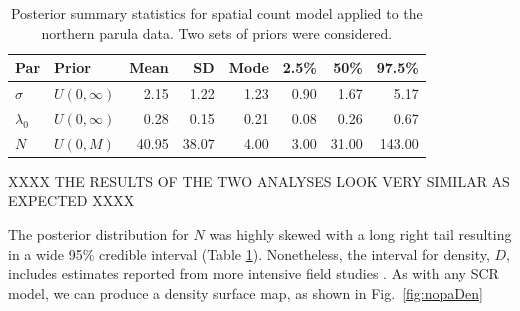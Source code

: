 \begin{table}%
  \caption{Posterior summary statistics for spatial count
    model applied to the northern parula data. Two sets of priors were
    considered. }
  \begin{tabular}{l l rrrrrr}
    \hline
    Par          & Prior          & Mean  & SD    & Mode  & 2.5\% & 50\% & 97.5\% \\
    \hline
    $\sigma$     & $U(0, \infty)$ & 2.15  & 1.22  & 1.23  & 0.90   & 1.67  & 5.17   \\
    $\lambda_0$  & $U(0, \infty)$ & 0.28  & 0.15  & 0.21  & 0.08   & 0.26  & 0.67   \\
    $N$          & $U(0, M)$      & 40.95 & 38.07 & 4.00  & 3.00   & 31.00 & 143.00 \\
    \hline
    \hline
  \end{tabular}
  \label{t:nopaPosts}
\vspace{0.5cm}
\end{table}


XXXX THE RESULTS OF THE TWO ANALYSES LOOK VERY SIMILAR AS EXPECTED XXXX

The posterior distribution for
$N$ was highly skewed with a long right tail resulting in a wide 95\%
credible interval (Table \ref{t:nopaPosts}). Nonetheless, the interval
for density, $D$, includes estimates reported from more intensive field
studies \citep{moldenhaer_regelski:1996}. As with any SCR model,
we can produce a density surface map, as shown in Fig.~\ref{fig:nopaDen}







